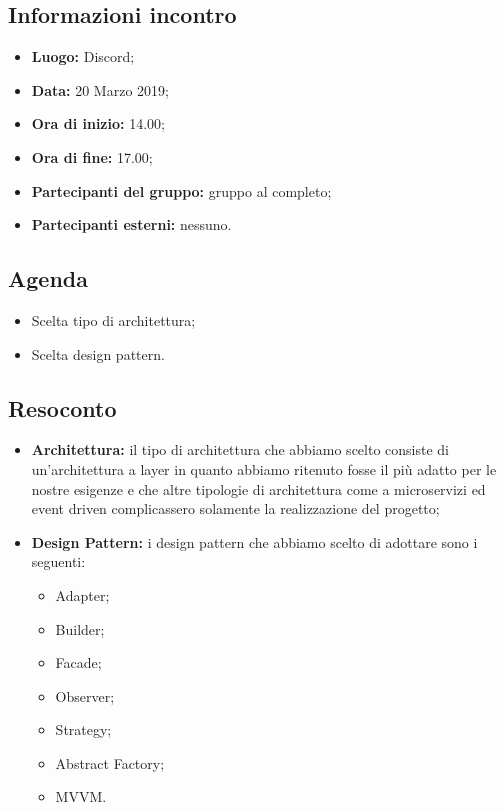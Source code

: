\subsection{Informazioni incontro}
\begin{itemize}
	\item { \textbf{Luogo:} Discord};
	\item { \textbf{Data:} 20 Marzo 2019};
	\item { \textbf{Ora di inizio:} 14.00};
	\item { \textbf{Ora di fine:} 17.00};
	\item { \textbf{Partecipanti del gruppo:} gruppo al completo};
	\item { \textbf{Partecipanti esterni:} nessuno}.
\end{itemize}


\subsection{Agenda}
\begin{itemize}
	\item {Scelta tipo di architettura;}
	\item {Scelta design pattern.}
\end{itemize}

\subsection{Resoconto}
\begin{itemize}
	\item { \textbf{Architettura:} il tipo di architettura che abbiamo scelto consiste di un'architettura a layer in quanto abbiamo ritenuto fosse il più adatto per le nostre esigenze e che altre tipologie di architettura come a microservizi ed event driven complicassero solamente la realizzazione del progetto;}
	\item { \textbf{Design Pattern:} i design pattern che abbiamo scelto di adottare sono i seguenti:
	\begin{itemize}
		\item Adapter;
		\item Builder;
		\item Facade;
		\item Observer;
		\item Strategy;
		\item Abstract Factory;
		\item MVVM.
	\end{itemize}}	
\end{itemize}

